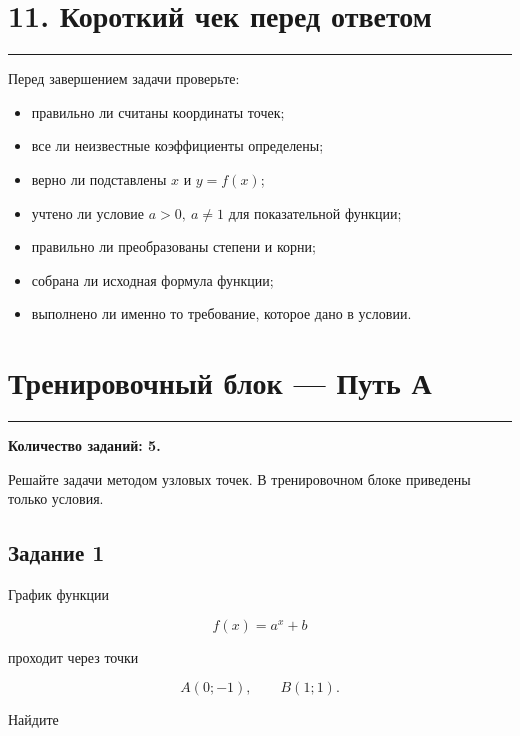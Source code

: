 \documentclass[a4paper,12pt]{article}
\newcommand{\sectionline}{%
    \vspace{0.2em}
    {\color{accent}\rule{\linewidth}{0.7pt}}
    \vspace{0.45em}
}
\begin{document}
\section*{\textcolor{darkaccent}{11. Короткий чек перед ответом}}

\sectionline

Перед завершением задачи проверьте:

\begin{itemize}[leftmargin=7mm,itemsep=2mm]
    \item правильно ли считаны координаты точек;
    \item все ли неизвестные коэффициенты определены;
    \item верно ли подставлены \(x\) и \(y=f(x)\);
    \item учтено ли условие \(a>0,\ a\ne1\) для показательной функции;
    \item правильно ли преобразованы степени и корни;
    \item собрана ли исходная формула функции;
    \item выполнено ли именно то требование, которое дано в условии.
\end{itemize}


\clearpage

\section*{\textcolor{darkaccent}{Тренировочный блок --- Путь А}}

\sectionline

\textbf{Количество заданий: 5.}

Решайте задачи методом узловых точек. В тренировочном блоке приведены только условия.

\vspace{3mm}

\subsection*{\textcolor{accent}{Задание 1}}

График функции

\[
f(x)=a^x+b
\]

проходит через точки

\[
A(0;-1),
\qquad
B(1;1).
\]

Найдите
\end{document}
